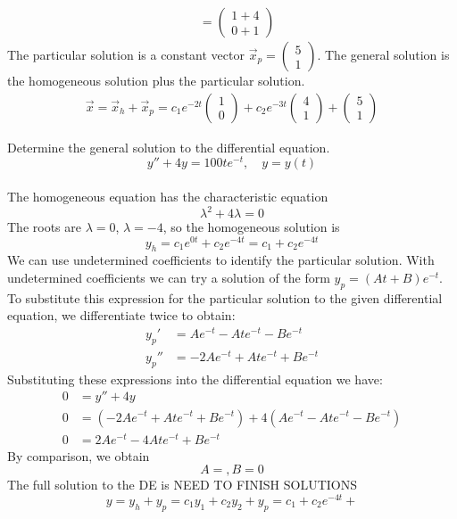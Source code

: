 {\begin{align}
    & =  \begin{pmatrix} 1 + 4 \\ 0 + 1\end{pmatrix} 
\end{align}
The particular solution is a constant vector $\displaystyle \vec x_p =  \begin{pmatrix} 5 \\ 1 \end{pmatrix}$. The general solution is the homogeneous solution plus the particular solution. 
\begin{align}
    \vec x = \vec x_h + \vec x_p = c_1e^{-2t}\begin{pmatrix}1\\0\end{pmatrix} + c_2e^{-3t}\begin{pmatrix}4\\1\end{pmatrix} + \begin{pmatrix} 5\\1\end{pmatrix}
\end{align}

    } 
   \else
   \fi

\fi 








\ifnum {}
\question[5] Determine the general solution to the differential equation. 
$$y'' + 4y = 100te^{-t}, \quad y=y(t)$$
\ifnum {} {\color{DarkBlue} \\[12pt] 
The homogeneous equation has the characteristic equation
$$\lambda ^2+4\lambda = 0$$
The roots are $\lambda= 0$, $\lambda = -4$, so the homogeneous solution is
$$y_h = c_1 e^{0t} + c_2 e^{-4t} = c_1 + c_2 e^{-4t}$$
We can use undetermined coefficients to identify the particular solution. With undetermined coefficients we can try a solution of the form $y_p = (At+B)e^{-t}$. To substitute this expression for the particular solution to the given differential equation, we differentiate twice to obtain:
\begin{align}
    y_p ' &= Ae^{-t} - Ate^{-t} - Be^{-t} \\
    y_p'' &= -2Ae^{-t} +Ate^{-t} + Be^{-t}
\end{align}
Substituting these expressions into the differential equation we have:
\begin{align}
    0 &= y'' + 4y \\
    0 &= (-2Ae^{-t} +Ate^{-t} +    Be^{-t}) +4 (Ae^{-t} - Ate^{-t} - Be^{-t}) \\ 
    0 &= 2Ae^{-t} - 4Ate^{-t} + Be^{-t}
\end{align}
By comparison, we obtain
$$ A = , B = 0$$
The full solution to the DE is NEED TO FINISH SOLUTIONS
$$y = y_h + y_p = c_1y_1  + c_2y_2 + y_p = c_1 + c_2 e^{-4t} + $$
} 
\else 
\vspace{3cm}
\fi
\fi 